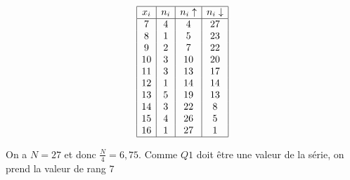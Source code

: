 \begin{defi}
\begin{itemize}
\begin{ex}
\begin{table}[H]
                                                \[
                                                      \begin{array}{|c|c|c|c|}
                                                      \hline
                                                      x_i      & n_i      & n_i \uparrow & n_i \downarrow \\
                                                      \hline
                                                      7        & 4        & 4            & 27             \\
                                                      8        & 1        & 5            & 23             \\
                                                      9        & 2        & 7            & 22             \\
                                                      10       & 3        & 10           & 20             \\
                                                      11       & 3        & 13           & 17             \\
                                                      12       & 1        & 14           & 14             \\
                                                      13       & 5        & 19           & 13             \\
                                                      14       & 3        & 22           &  8             \\
                                                      15       & 4        & 26           &  5             \\
                                                      16       & 1        & 27           &  1             \\
                                                      \hline
                                                      \end{array}
                                                \]
                                                \caption{Tableau repr\'esentant des donn\'ees inconnues.}
                                                \label{tab:quartiles}
                                                \end{table}
                                                On a $N = 27$ et donc $\frac{N}{4} = 6,75$.
                                                Comme $Q1$ doit \^etre une valeur de la s\'erie, on prend la valeur de rang $7$

\end{ex}
\end{itemize}
\end{defi}
